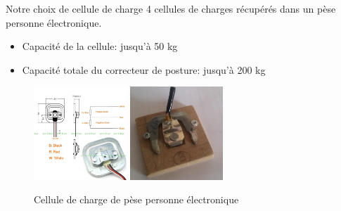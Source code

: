 \documentclass{beamer}
\begin{document}
\begin{frame}
\begin{block}{Notre choix de cellule de charge}
4 cellules de charges récupérés dans un pèse personne électronique.
\begin{itemize}
\item Capacité de la cellule: jusqu'à 50 kg 
\item Capacité totale du correcteur de posture: jusqu'à 200 kg
\end{itemize}
\begin{figure}
\begin{center}
\includegraphics[height=3.5cm]{images/load_sensor.jpg}
\includegraphics[height=3.5cm]{images/load_sensor2.jpg}
\end{center}
\caption{Cellule de charge de pèse personne électronique}
\label{fig:load_cell_1}
\end{figure}
\end{block}
\end{frame}
\end{document}
